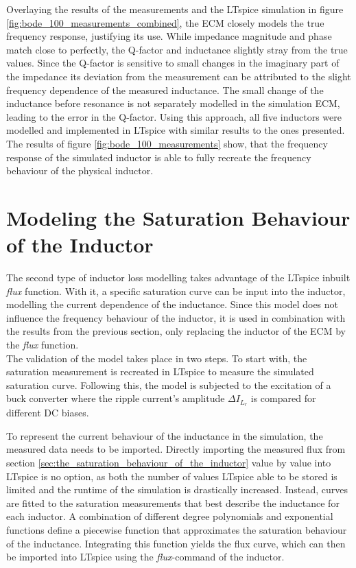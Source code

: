 Overlaying the results of the measurements and the LTspice simulation in figure \ref{fig:bode_100_measurements_combined}, the \ac{ECM} closely models the true frequency response, justifying its use. While impedance magnitude and phase match close to perfectly, the \ac{Q-factor} and inductance slightly stray from the true values. Since the \ac{Q-factor} is sensitive to small changes in the imaginary part of the impedance its deviation from the measurement can be attributed to the slight frequency dependence of the measured inductance. The small change of the inductance before resonance is not separately modelled in the simulation \ac{ECM}, leading to the error in the \ac{Q-factor}.
Using this approach, all five inductors were modelled and implemented in LTspice with similar results to the ones presented. The results of figure \ref{fig:bode_100_measurements} show, that the frequency response of the simulated inductor is able to fully recreate the frequency behaviour of the physical inductor.

\section{Modeling the Saturation Behaviour of the Inductor}\label{sec:modeling_the_saturation_behaviour_of_the_inductor}
The second type of inductor loss modelling takes advantage of the LTspice inbuilt \textit{flux} function. With it, a specific saturation curve can be input into the inductor, modelling the current dependence of the inductance. Since this model does not influence the frequency behaviour of the inductor, it is used in combination with the results from the previous section, only replacing the inductor of the \ac{ECM} by the \textit{flux} function.\\
The validation of the model takes place in two steps. To start with, the saturation measurement is recreated in LTspice to measure the simulated saturation curve. Following this, the model is subjected to the excitation of a buck converter where the ripple current's amplitude $\Delta I_{L_r}$ is compared for different \ac{DC} biases. 

To represent the current behaviour of the inductance in the simulation, the measured data needs to be imported. Directly importing the measured flux from section \ref{sec:the_saturation_behaviour_of_the_inductor} value by value into LTspice is no option, as both the number of values LTspice able to be stored is limited and the runtime of the simulation is drastically increased. Instead, curves are fitted to the saturation measurements that best describe the inductance for each inductor. A combination of different degree polynomials and exponential functions define a piecewise function that approximates the saturation behaviour of the inductance. Integrating this function yields the flux curve, which can then be imported into LTspice using the \textit{flux}-command of the inductor.

